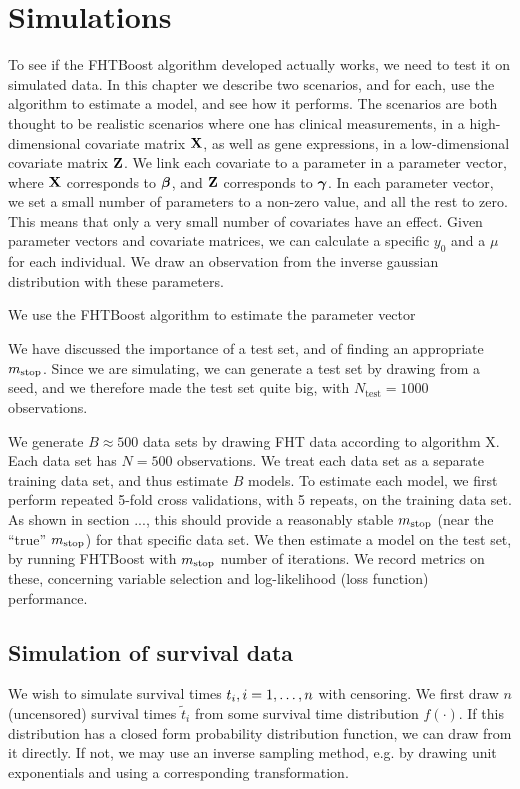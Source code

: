 \chapter{Simulations}
To see if the FHTBoost algorithm developed actually works, we need to test it on simulated data. In this chapter we describe two scenarios,
and for each, use the algorithm to estimate a model, and see how it performs. The scenarios are both thought to be realistic scenarios
where one has clinical measurements, in a high-dimensional covariate matrix $\mathbf{X}$, as well as gene expressions,
in a low-dimensional covariate matrix $\mathbf{Z}$. We link each covariate to a parameter in a parameter vector,
where $\mathbf{X}$ corresponds to $\boldsymbol{\beta}$, and $\mathbf{Z}$ corresponds to $\boldsymbol{\gamma}$. In each parameter vector, we set a small number of parameters
to a non-zero value, and all the rest to zero. This means that only a very small number of covariates have an effect.
Given parameter vectors and covariate matrices, we can calculate a specific $y_0$ and a $\mu$ for each individual.
We draw an observation from the inverse gaussian distribution with these parameters.

We use the FHTBoost algorithm to estimate the parameter vector

We have discussed the importance of a test set, and of finding an appropriate $m_{\text{stop}}$. Since we are simulating, we can generate a test set
by drawing from a seed, and we therefore made the test set quite big, with $N_{\text{test}}=1000$ observations.

We generate $B\approx500$ data sets by drawing FHT data according to algorithm X. Each data set has $N=500$ observations. 
We treat each data set as a separate training data set, and thus estimate $B$ models.
To estimate each model, we first perform repeated 5-fold cross validations, with 5 repeats, on the training data set.
As shown in section ..., this should provide a reasonably stable $m_{\text{stop}}$ (near the ``true'' $m_{\text{stop}}$) for that specific data set.
We then estimate a model on the test set, by running FHTBoost with $m_{\text{stop}}$ number of iterations. We record metrics on these,
concerning variable selection and log-likelihood (loss function) performance.

\section{Simulation of survival data}
We wish to simulate survival times $t_{i},i=1,\ldots,n$ with censoring. We first draw $n$ (uncensored) survival times $\tilde{t}_i$ from some survival time distribution $f(\cdot)$. If this distribution has a closed form probability distribution function, we can draw from it directly. If not, we may use an inverse sampling method, e.g. by drawing unit exponentials and using a corresponding transformation.

